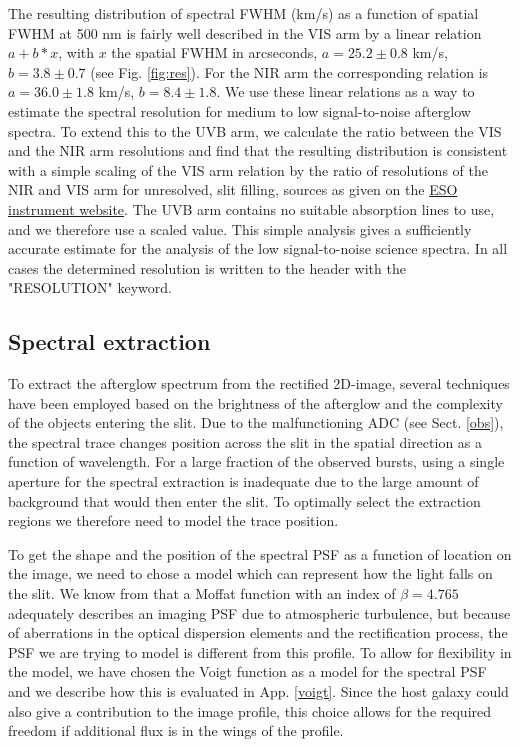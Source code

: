 \documentclass[longauth]{aa}    %
\begin{document}
The resulting distribution of spectral FWHM (km/s) as a function of spatial FWHM
at 500 nm is fairly well described in the VIS arm by a linear relation $a +
b*x$, with $x$ the spatial FWHM in arcseconds, $a= 25.2 \pm 0.8$ km/s, $b=3.8
\pm 0.7$ (see Fig. \ref{fig:res}). For the NIR arm the corresponding relation is
$a= 36.0 \pm 1.8$ km/s, $b=8.4 \pm 1.8$. We use these linear relations as a way
to estimate the spectral resolution for medium to low signal-to-noise afterglow
spectra. To extend this to the UVB arm, we calculate the ratio between the VIS
and the NIR arm resolutions and find that the resulting distribution is
consistent with a simple scaling of the VIS arm relation by the ratio of
resolutions of the NIR and VIS arm for unresolved, slit filling, sources as
given on the
\href{https://www.eso.org/sci/facilities/paranal/instruments/xshooter/inst.html}{ESO instrument website}. The UVB arm contains no suitable absorption lines to use, and we therefore use a scaled value. This simple analysis gives a sufficiently accurate estimate for the analysis of the low signal-to-noise science spectra. In all cases the determined resolution is written to the header with the "RESOLUTION" keyword.



\subsection{Spectral extraction}    \label{extract}

To extract the afterglow spectrum from the rectified 2D-image, several
techniques have been employed based on the brightness of the afterglow and the
complexity of the objects entering the slit. Due to the malfunctioning ADC (see
Sect. \ref{obs}), the spectral trace changes position across the slit in the
spatial direction as a function of wavelength. For a large fraction of the
observed bursts, using a single aperture for the spectral extraction is
inadequate due to the large amount of background that would then enter the slit.
To optimally select the extraction regions we therefore need to model the trace
position.

To get the shape and the position of the spectral PSF as a function of location
on the image, we need to chose a model which can represent how the light falls
on the slit. We know from \citet{Trujillo2001} that a Moffat function
\citep{Moffat1969} with an index of $\beta = 4.765$ adequately describes an
imaging PSF due to atmospheric turbulence, but because of aberrations in the
optical dispersion elements and the rectification process, the PSF we are trying to
model is different from this profile. To allow for flexibility in the model, we
have chosen the Voigt function as a model for the spectral PSF and we describe
how this is evaluated in App. \ref{voigt}. Since the host galaxy could also give
a contribution to the image profile, this choice allows for the required freedom
if additional flux is in the wings of the profile.
\end{document}
